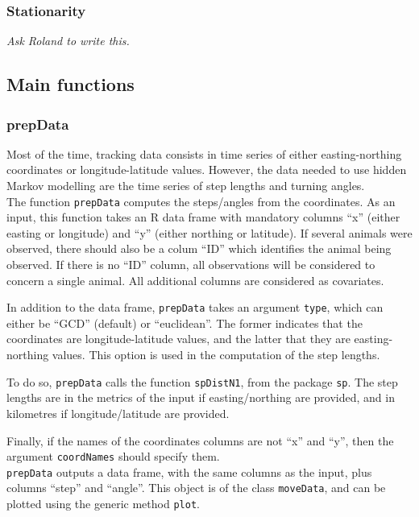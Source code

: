 \documentclass[]{article}
\begin{document}
\subsubsection{Stationarity}
\textit{Ask Roland to write this.}

\subsection{Main functions} \label{main_functions}

\subsubsection{prepData}
Most of the time, tracking data consists in time series of either easting-northing coordinates or longitude-latitude values. However, the data needed to use hidden Markov modelling are the time series of step lengths and turning angles.\\

The function \texttt{prepData} computes the steps/angles from the coordinates. As an input, this function takes an R data frame with mandatory columns ``x'' (either easting or longitude) and ``y'' (either northing or latitude). If several animals were observed, there should also be a colum ``ID'' which identifies the animal being observed. If there is no ``ID'' column, all observations will be considered to concern a single animal. All additional columns are considered as covariates.

In addition to the data frame, \texttt{prepData} takes an argument \texttt{type}, which can either be ``GCD'' (default) or ``euclidean''. The former indicates that the coordinates are longitude-latitude values, and the latter that they are easting-northing values. This option is used in the computation of the step lengths.

To do so, \texttt{prepData} calls the function \texttt{spDistN1}, from the package \texttt{sp}. The step lengths are in the metrics of the input if easting/northing are provided, and in kilometres if longitude/latitude are provided.

Finally, if the names of the coordinates columns are not ``x'' and ``y'', then the argument \texttt{coordNames} should specify them.\\

\texttt{prepData} outputs a data frame, with the same columns as the input, plus columns ``step'' and ``angle''. This object is of the class \texttt{moveData}, and can be plotted using the generic method \texttt{plot}.
\end{document}
